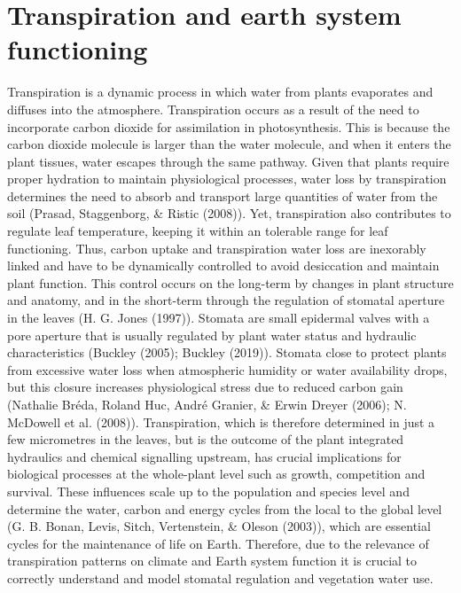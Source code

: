 \documentclass[11pt,twoside]{reedthesis}
\begin{document}
\newpage

\section{Transpiration and earth system
functioning}\label{transpiration-and-earth-system-functioning}

Transpiration is a dynamic process in which water from plants evaporates
and diffuses into the atmosphere. Transpiration occurs as a result of
the need to incorporate carbon dioxide for assimilation in
photosynthesis. This is because the carbon dioxide molecule is larger
than the water molecule, and when it enters the plant tissues, water
escapes through the same pathway. Given that plants require proper
hydration to maintain physiological processes, water loss by
transpiration determines the need to absorb and transport large
quantities of water from the soil (Prasad, Staggenborg, \& Ristic
(2008)). Yet, transpiration also contributes to regulate leaf
temperature, keeping it within an tolerable range for leaf functioning.
Thus, carbon uptake and transpiration water loss are inexorably linked
and have to be dynamically controlled to avoid desiccation and maintain
plant function. This control occurs on the long-term by changes in plant
structure and anatomy, and in the short-term through the regulation of
stomatal aperture in the leaves (H. G. Jones (1997)). Stomata are small
epidermal valves with a pore aperture that is usually regulated by plant
water status and hydraulic characteristics (Buckley (2005); Buckley
(2019)). Stomata close to protect plants from excessive water loss when
atmospheric humidity or water availability drops, but this closure
increases physiological stress due to reduced carbon gain (Nathalie
Bréda, Roland Huc, André Granier, \& Erwin Dreyer (2006); N. McDowell et
al. (2008)). Transpiration, which is therefore determined in just a few
micrometres in the leaves, but is the outcome of the plant integrated
hydraulics and chemical signalling upstream, has crucial implications
for biological processes at the whole-plant level such as growth,
competition and survival. These influences scale up to the population
and species level and determine the water, carbon and energy cycles from
the local to the global level (G. B. Bonan, Levis, Sitch, Vertenstein,
\& Oleson (2003)), which are essential cycles for the maintenance of
life on Earth. Therefore, due to the relevance of transpiration patterns
on climate and Earth system function it is crucial to correctly
understand and model stomatal regulation and vegetation water use.\par
\end{document}
